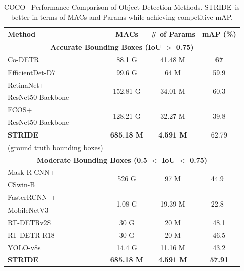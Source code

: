 \documentclass{article}
\newcommand{\name}{STRIDE}
\begin{document}
\begin{table}[htbp]
\centering
\caption{\small COCO~\cite{lin2014microsoft, coco_eval} Performance Comparison of Object Detection Methods. \name\ is better in terms of MACs and Params while achieving competitive mAP.}
\label{tab:COCO_performance_comparison}
\begin{adjustbox}{max width=\columnwidth}
\begin{tabular}{lccc}
\toprule
\textbf{Method} & \textbf{MACs} & \textbf{\# of Params} & \textbf{mAP (\%)}\\
\toprule
\multicolumn{4}{c}{\textbf{Accurate Bounding Boxes (IoU $>$ 0.75)}} \\
\cmidrule(lr){1-4}
Co-DETR~\cite{detr,zong2023detrs} & 88.1 G & 41.48 M & \textbf{67} \\
EfficientDet-D7~\cite{tan2020efficientdet} & 99.6 G & 64 M & 59.9 \\
RetinaNet+~\cite{lin2017focal,pytorchvision_retinanet} & \multirow{2}{*}{152.81 G} & \multirow{2}{*}{34.01 M} & \multirow{2}{*}{60.3} \\
ResNet50 Backbone & & &\\
FCOS+~\cite{fcos} & \multirow{2}{*}{128.21 G} & \multirow{2}{*}{32.27 M} & \multirow{2}{*}{39.8} \\
ResNet50 Backbone & & &\\
\textbf{\name} & \textbf{685.18 M} & \textbf{4.591 M} & 62.79  \\
(ground truth bounding boxes) &&&\\
\cmidrule(lr){1-4}
\multicolumn{4}{c}{\textbf{Moderate Bounding Boxes (0.5 $<$ IoU $<$ 0.75)}} \\
\cmidrule(lr){1-4}
Mask R-CNN+~\cite{he2017mask} & \multirow{2}{*}{526 G} & \multirow{2}{*}{97 M} & \multirow{2}{*}{44.9~\cite{dong2022cswin}} \\
CSwin-B~\cite{dong2022cswin} & & &\\
FasterRCNN~\cite{ren2015faster}+ & \multirow{2}{*}{1.08 G} & \multirow{2}{*}{19.39 M} &\multirow{2}{*}{22.8~\cite{fasterrcnn}}\\
MobileNetV3~\cite{mobilenet} & & &\\
RT-DETRv2S~\cite{rtdetrv2} & 30 G & 20 M &48.1\\
RT-DETR-R18~\cite{rtdetr} & 30 G & 20 M &46.5\\
YOLO-v8s~\cite{yolo, yolo_v8} & 14.4 G & 11.16 M & 43.2 \\
\textbf{\name} & \textbf{685.18 M} & \textbf{4.591 M} & \textbf{57.91}  \\

\end{tabular}
\end{adjustbox}
\end{table}
\end{document}
